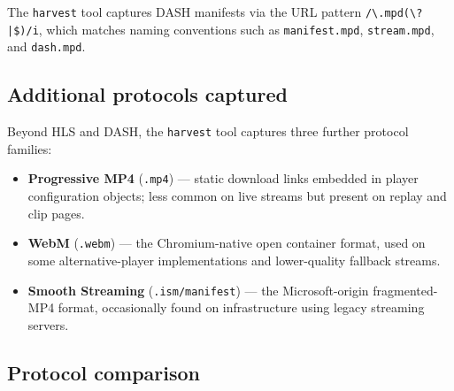 The \texttt{harvest} tool captures DASH manifests via the URL pattern
\texttt{/\textbackslash.mpd(\textbackslash?|\$)/i}, which matches naming conventions such
as \texttt{manifest.mpd}, \texttt{stream.mpd}, and \texttt{dash.mpd}.

\subsection{Additional protocols captured}

Beyond HLS and DASH, the \texttt{harvest} tool captures three further protocol families:

\begin{itemize}
  \item \textbf{Progressive MP4} (\texttt{.mp4}) — static download links embedded in
    player configuration objects; less common on live streams but present on replay and
    clip pages.
  \item \textbf{WebM} (\texttt{.webm}) — the Chromium-native open container format, used
    on some alternative-player implementations and lower-quality fallback streams.
  \item \textbf{Smooth Streaming} (\texttt{.ism/manifest}) — the Microsoft-origin
    fragmented-MP4 format, occasionally found on infrastructure using legacy streaming
    servers.
\end{itemize}

\subsection{Protocol comparison}

